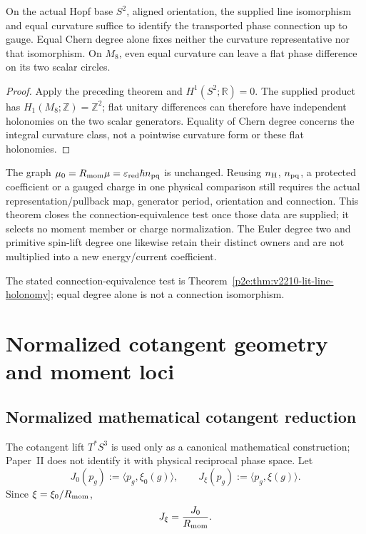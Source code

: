 \documentclass[12pt,a4paper]{article}
\begin{document}
\begin{corollary}
\label{p2e:cor:v2210-lit-degree-versus-phase}
On the actual Hopf base $S^2$, aligned orientation, the supplied line
isomorphism and equal curvature suffice to identify the transported phase
connection up to gauge.  Equal Chern degree alone fixes neither the
curvature representative nor that isomorphism.  On $M_8$, even equal
curvature can leave a flat phase difference on its two scalar circles.
\end{corollary}
\begin{proof}
Apply the preceding theorem and $H^1(S^2;\mathbb R)=0$.  The supplied
product has $H_1(M_8;\mathbb Z)=\mathbb Z^2$; flat unitary differences
can therefore have independent holonomies on the two scalar generators.
Equality of Chern degree concerns the integral curvature class, not a
pointwise curvature form or these flat holonomies.
\end{proof}
The graph $\mu_0=R_{\mathrm{mom}}\mu=\varepsilon_{\rm red}\hbar n_{\rm pq}$ is
unchanged.  Reusing $n_{\rm H}$, $n_{\rm pq}$, a protected coefficient or
a gauged charge in one physical comparison still requires the actual
representation/pullback map, generator period, orientation and connection.
This theorem closes the connection-equivalence test once those data are
supplied; it selects no moment member or charge normalization.  The Euler
degree two and primitive spin-lift degree one likewise retain their distinct
owners and are not multiplied into a new energy/current coefficient.


The stated connection-equivalence test is Theorem~\ref{p2e:thm:v2210-lit-line-holonomy}; equal degree alone is not a connection isomorphism.

\section{Normalized cotangent geometry and moment loci}
\label{paper2e:sec:organized-cotangent}

\subsection{Normalized mathematical cotangent reduction}
\label{p2e:sec:cotangent-reduction}

The cotangent lift \(T^*S^3\) is used only as a canonical mathematical
construction; Paper~II does not identify it with physical reciprocal phase
space.  Let
\[
 J_0(p_g):=\langle p_g,\xi_0(g)\rangle,
 \qquad
 J_\xi(p_g):=\langle p_g,\xi(g)\rangle.
\]
Since \(\xi=\xi_0/R_{\mathrm{mom}}\),
\[
        J_\xi=\frac{J_0}{R_{\mathrm{mom}}}.
\]
\end{document}
